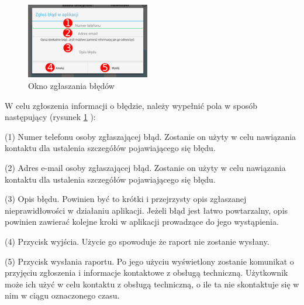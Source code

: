 \documentclass[a4paper,10pt,twosided]{book}
\newcommand{\refwithpage}[3]{
\ref{#1}\ifthenelse{\equal{\thepage}{\pageref{#1}}}{}{#2\pageref{#1}#3}%
}
\newcommand{\ppref}[1]{\refwithpage{#1}{ -- strona }{}}
\begin{document}
\begin{figure}
\includegraphics[width=0.48\textwidth]{window_report_bug.pdf}
\caption{Okno zgłaszania błędów}
\label{fig:bug_report}
\end{figure}

W celu zgłoszenia informacji o błędzie, należy wypełnić pola w sposób następujący (rysunek \ppref{fig:bug_report}):

(1) Numer telefonu osoby zgłaszającej błąd. Zostanie on użyty w celu nawiązania kontaktu dla ustalenia szczegółów pojawiającego się błędu.

(2) Adres e-mail osoby zgłaszającej błąd. Zostanie on użyty w celu nawiązania kontaktu dla ustalenia szczegółów pojawiającego się błędu.

(3) Opis błędu. Powinien być to krótki i przejrzysty opis zgłaszanej nieprawidłowości w działaniu aplikacji. Jeżeli błąd jest łatwo powtarzalny, opis powinien zawierać kolejne kroki w aplikacji prowadzące do jego wystąpienia.

(4) Przycisk wyjścia. Użycie go spowoduje że raport nie zostanie wysłany.

(5) Przycisk wysłania raportu. Po jego użyciu wyświetlony zostanie komunikat o przyjęciu zgłoszenia i informacje kontaktowe z obsługą techniczną. Użytkownik może ich użyć w celu kontaktu z obsługą techniczną, o ile ta nie skontaktuje się w nim w ciągu oznaczonego czasu.

\listoffigures
\end{document}
